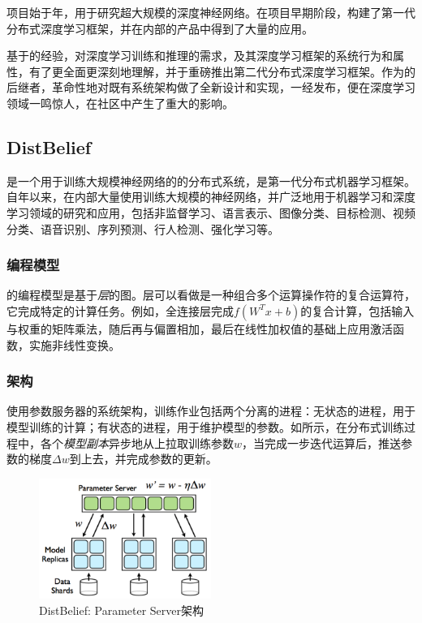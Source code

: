 \begin{content}

项目始于年，用于研究超大规模的深度神经网络。在项目早期阶段，构建了第一代分布式深度学习框架，并在内部的产品中得到了大量的应用。

基于的经验，对深度学习训练和推理的需求，及其深度学习框架的系统行为和属性，有了更全面更深刻地理解，并于重磅推出第二代分布式深度学习框架\tf{}。\tf{}作为的后继者，革命性地对既有系统架构做了全新设计和实现，\tf{}一经发布，便在深度学习领域一鸣惊人，在社区中产生了重大的影响。

\subsection{DistBelief}

是一个用于训练大规模神经网络的的分布式系统，是第一代分布式机器学习框架。自年以来，在内部大量使用训练大规模的神经网络，并广泛地用于机器学习和深度学习领域的研究和应用，包括非监督学习、语言表示、图像分类、目标检测、视频分类、语音识别、序列预测、行人检测、强化学习等。

\subsubsection{编程模型}

的编程模型是基于\emph{层}的图。层可以看做是一种组合多个运算操作符的复合运算符，它完成特定的计算任务。例如，全连接层完成$f({W^T}x + b)$的复合计算，包括输入与权重的矩阵乘法，随后再与偏置相加，最后在线性加权值的基础上应用激活函数，实施非线性变换。

\subsubsection{架构}

使用参数服务器的系统架构，训练作业包括两个分离的进程：无状态的进程，用于模型训练的计算；有状态的进程，用于维护模型的参数。如所示，在分布式训练过程中，各个\emph{模型副本}异步地从上拉取训练参数$w$，当完成一步迭代运算后，推送参数的梯度$ \Delta w $到上去，并完成参数的更新。

\begin{figure}[H]
\centering
\includegraphics[width=0.5\textwidth]{figures/parameter-server.png}
\caption{DistBelief: Parameter Server架构}
 \label{fig:parameter-server}
\end{figure}


\end{content}
